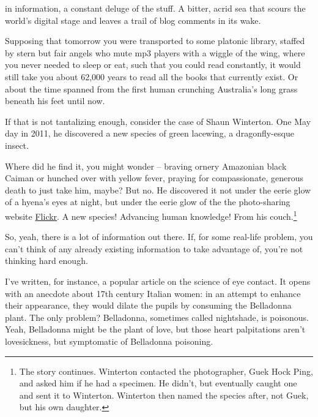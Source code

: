 in information, a constant deluge of the
stuff. A bitter, acrid sea that scours the world's digital stage and leaves a
trail of blog comments in its wake.

Supposing that tomorrow you were transported to some platonic
library, staffed
by stern but fair angels who mute mp3 players with a wiggle of the wing, where
you never needed to sleep or eat, such that you could read constantly, it would
still take you about 62,000 years to read all the books that currently
exist. Or about the time spanned from the first human crunching Australia's
long grass
beneath his feet until
now.  

If that is not tantalizing enough, consider the case of Shaun Winterton. One May day in 2011, he discovered a new species of green lacewing, a dragonfly-esque insect.

Where did he find it, you might wonder -- braving ornery Amazonian black Caiman
or hunched over with yellow fever, praying for compassionate, generous death to just take him, maybe? But no. He discovered it not under the
eerie glow of a hyena's eyes at night, but under the eerie glow of the the
photo-sharing website \href{https://www.flickr.com/}{Flickr}. A new species! Advancing human
knowledge! From his couch.\footnote{The story
  continues. Winterton contacted the photographer, Guek Hock Ping, and asked him
  if he had a specimen. He didn't, but eventually caught one and sent it to
  Winterton. Winterton then named the species after, not Guek, but his own daughter.}\cite{winterton2012charismatic}

So, yeah, there is a lot of information out there. If, for some real-life problem, you can't think of any already existing information to take advantage of, you're not thinking hard enough.

I've written, for instance, a popular article on the science of eye contact. It
opens with an anecdote about 17th century Italian women: in an attempt to
enhance their appearance, they would dilate the pupils by consuming the Belladonna plant. The only problem? Belladonna, sometimes called nightshade, is
poisonous. Yeah, Belladonna might be the plant of love, but those heart
palpitations aren't lovesickness, but symptomatic of Belladonna poisoning.

